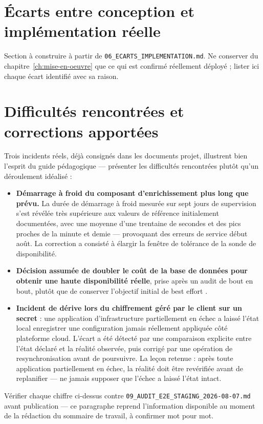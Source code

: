 \section{Écarts entre conception et implémentation réelle}

\begin{attentedoc}
Section à construire à partir de \texttt{06\_ECARTS\_IMPLEMENTATION.md}. Ne conserver du
chapitre~\ref{ch:mise-en-oeuvre} que ce qui est confirmé réellement déployé ; lister ici
chaque écart identifié avec sa raison.
\end{attentedoc}

\section{Difficultés rencontrées et corrections apportées}

Trois incidents réels, déjà consignés dans les documents projet, illustrent bien l'esprit du
guide pédagogique --- présenter les difficultés rencontrées plutôt qu'un déroulement
idéalisé :

\begin{itemize}
  \item \textbf{Démarrage à froid du composant d'enrichissement plus long que prévu.} La
        durée de démarrage à froid mesurée sur sept jours de supervision s'est révélée très
        supérieure aux valeurs de référence initialement documentées, avec une moyenne
        d'une trentaine de secondes et des pics proches de la minute et demie --- provoquant
        des erreurs de service début août. La correction a consisté à élargir la fenêtre de
        tolérance de la sonde de disponibilité.
  \item \textbf{Décision assumée de doubler le coût de la base de données pour obtenir une
        haute disponibilité réelle}, prise après un audit de bout en bout, plutôt que de
        conserver l'objectif initial de \og best effort \fg{}.
  \item \textbf{Incident de dérive lors du chiffrement géré par le client sur un secret} :
        une application d'infrastructure partiellement en échec a laissé l'état local
        enregistrer une configuration jamais réellement appliquée côté plateforme cloud.
        L'écart a été détecté par une comparaison explicite entre l'état déclaré et la
        réalité observée, puis corrigé par une opération de resynchronisation avant de
        poursuivre. La leçon retenue : après toute application partiellement en échec, la
        réalité doit être revérifiée avant de replanifier --- ne jamais supposer que
        l'échec a laissé l'état intact.
\end{itemize}

\begin{attentedoc}
Vérifier chaque chiffre ci-dessus contre \texttt{09\_AUDIT\_E2E\_STAGING\_2026-08-07.md}
avant publication --- ce paragraphe reprend l'information disponible au moment de la
rédaction du sommaire de travail, à confirmer mot pour mot.
\end{attentedoc}
